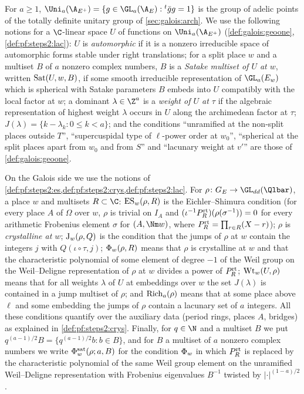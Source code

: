For $a\ge1$, $\geoUa=\{g\in\GL_a(\A_E):{}^t\bar gg=1\}$ is the group of adelic points of the
totally definite unitary group of \cref{sec:galois:arch}. We use the following notions for a
$\C$-linear space $U$ of functions on $\geoUa$ (\cref{def:galois:geoone},
\cref{def:pf:steps2:lac}): $U$ is \emph{automorphic} if it is a nonzero irreducible space of
automorphic forms stable under right translations; for a split place $w$ and a multiset $B$ of $a$
nonzero complex numbers, $B$ is a \emph{Satake multiset of $U$ at $w$}, written
$\mathrm{Sat}(U,w,B)$, if some smooth irreducible representation of $\GL_a(E_w)$ which is spherical with
Satake parameters $B$ embeds into $U$ compatibly with the local factor at $w$; a dominant
$\lambda\in\Z^a$ is a \emph{weight of $U$ at $\tau$} if the algebraic representation of highest weight
$\lambda$ occurs in $U$ along the archimedean factor at $\tau$; $J(\lambda)=\{k-\lambda_k:0\le
k<a\}$; and the conditions ``unramified at the non-split places outside $T$'', ``supercuspidal
type of $\ell$-power order at $w_0$'', ``spherical at the split places apart from $w_0$ and from $S$''
and ``lacunary weight at $v'$'' are those of \cref{def:galois:geoone}.

On the Galois side we use the notions of \cref{def:pf:steps2:es,def:pf:steps2:crys,def:pf:steps2:lac}.
For $\rho\colon G_E\to\GL_{dd}(\Qlbar)$, a place $w$ and multisets $R\subset\C$:
$\mathrm{ES}_w(\rho,R)$ is the Eichler--Shimura condition (for every place $A$ of $\Omega$ over $w$, $\rho$ is
trivial on $I_A$ and $(\iota^{-1}P^{\mathrm{rt}}_R)(\rho(\sigma^{-1}))=0$ for every arithmetic Frobenius
element $\sigma$ for $(A,\Nm w)$, where $P^{\mathrm{rt}}_R=\prod_{r\in R}(X-r)$); $\rho$ is
\emph{crystalline at $w$}; $\mathrm{J}_w(\rho,Q)$ is the condition that the jumps of $\rho$ at $w$
contain the integers $j$ with $Q(\iota\circ\tau,j)$; $\Phi_w(\rho,R)$ means that $\rho$ is
crystalline at $w$ and that the characteristic polynomial of some element of degree $-1$ of the
Weil group on the Weil--Deligne representation of $\rho$ at $w$ divides a power of $P^{\mathrm{rt}}_R$;
$\mathrm{Wt}_w(U,\rho)$ means that for all weights $\lambda$ of $U$ at embeddings over $w$ the set
$J(\lambda)$ is contained in a jump multiset of $\rho$; and $\mathrm{Rich}_a(\rho)$ means that at some
place above $\ell$ and some embedding the jumps of $\rho$ contain a lacunary set of $a$ integers. All
these conditions quantify over the auxiliary data (period rings, places $A$, bridges) as explained in
\cref{def:pf:steps2:crys}. Finally, for $q\in\N$ and a multiset $B$ we put
$q^{(a-1)/2}B=\{q^{(a-1)/2}b:b\in B\}$, and for $B$ a multiset of $a$ nonzero complex numbers we write
$\Phi^{\mathrm{sat}}_w(\rho;a,B)$ for the condition $\Phi_w$ in which $P^{\mathrm{rt}}_R$ is replaced by
the characteristic polynomial of the same Weil group element on the unramified Weil--Deligne
representation with Frobenius eigenvalues $B^{-1}$ twisted by $|\cdot|^{(1-a)/2}$.

